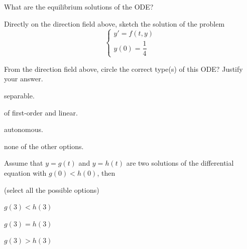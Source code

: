 \begin{parts}
	\item What are the equilibrium solutions of the ODE?


\item Directly on the direction field above, sketch the solution of the problem
$$
\begin{cases}
y'=f(t,y) \\
y(0) = \dfrac14
\end{cases}
$$

\item From the direction field above, circle the correct type(s) of this ODE? Justify your answer.

\begin{enumerate}[label={\bf (\alph*)}]
\hfil 
\begin{minipage}{.3\textwidth}
\item separable. \\[-10pt]
\item of first-order and linear.
\end{minipage}
\hfil
\begin{minipage}{.4\textwidth}
\item autonomous. \\[-10pt]
\item none of the other options.
\end{minipage}
\end{enumerate}

\item Assume that $y=g(t)$ and $y=h(t)$ are two solutions of the differential equation with $g(0)<h(0)$, then

\hfill (select all the possible options)\\[-10pt]

\begin{enumerate}[label={\bf (\alph*)}]
\hfil 
\begin{minipage}{.2\textwidth}
\item $g(3) < h(3)$
\end{minipage}
\hfil
\begin{minipage}{.2\textwidth}
\item $g(3) = h(3)$
\end{minipage}
\hfil
\begin{minipage}{.2\textwidth}
\item $g(3) > h(3)$
\end{minipage}
\end{enumerate}

\end{parts}




